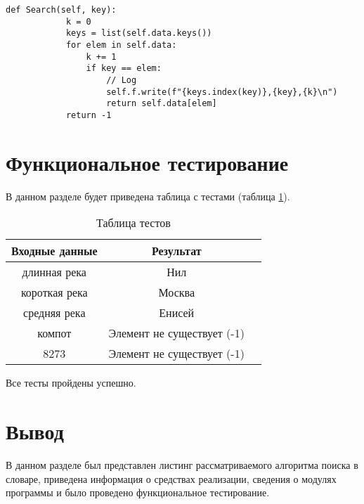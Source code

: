 \begin{center}
	\captionsetup{justification=raggedright,singlelinecheck=off}
	
	\begin{lstlisting}[label=lst:bfs,caption=Реализация алгоритма поиска полным перебором]
		def Search(self, key):
			k = 0
			keys = list(self.data.keys())
			for elem in self.data:
				k += 1
				if key == elem:
					// Log
					self.f.write(f"{keys.index(key)},{key},{k}\n") 
					return self.data[elem]
			return -1
	\end{lstlisting}
\end{center}

\section{Функциональное тестирование}

В данном разделе будет приведена таблица с тестами (таблица \ref{table:ref1}).
\begin{center}
	\captionsetup{justification=raggedright,singlelinecheck=off}
	\begin{table}[ht]
		\centering
		\caption{Таблица тестов}
		\label{table:ref1}
		\begin{tabular}{ |c|c|c|}
			\hline
			Входные данные     & Результат    \\ \hline
			\hline
			длинная река	& Нил \\ \hline
			короткая река 	& Москва \\ \hline
			средняя река & Енисей \\ \hline
			компот & Элемент не существует (-1) \\ \hline
			8273 &  Элемент не существует (-1) \\ \hline
		\end{tabular}
	\end{table}
\end{center}
Все тесты пройдены успешно.


\section*{Вывод}
В данном разделе был представлен листинг рассматриваемого алгоритма поиска в словаре, приведена информация о средствах реализации, сведения о модулях программы и было проведено функциональное тестирование.